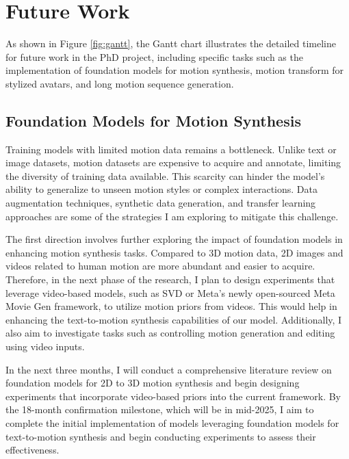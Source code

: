 \documentclass[a4paper, 12pt]{article}
\begin{document}
\section{Future Work}

As shown in Figure \ref{fig:gantt}, the Gantt chart illustrates the detailed timeline for future work in the PhD project, including specific tasks such as the implementation of foundation models for motion synthesis, motion transform for stylized avatars, and long motion sequence generation.

\subsection{Foundation Models for Motion Synthesis}
Training models with limited motion data remains a bottleneck. Unlike text or image datasets, motion datasets are expensive to acquire and annotate, limiting the diversity of training data available. This scarcity can hinder the model’s ability to generalize to unseen motion styles or complex interactions. Data augmentation techniques, synthetic data generation, and transfer learning approaches are some of the strategies I am exploring to mitigate this challenge.

The first direction involves further exploring the impact of foundation models in enhancing motion synthesis tasks. Compared to 3D motion data, 2D images and videos related to human motion are more abundant and easier to acquire. Therefore, in the next phase of the research, I plan to design experiments that leverage video-based models, such as SVD \cite{blattmann2023stable} or Meta's newly open-sourced Meta Movie Gen \cite{meta_movie_generation} framework, to utilize motion priors from videos. This would help in enhancing the text-to-motion synthesis capabilities of our model. Additionally, I also aim to investigate tasks such as controlling motion generation and editing using video inputs.

In the next three months, I will conduct a comprehensive literature review on foundation models for 2D to 3D motion synthesis and begin designing experiments that incorporate video-based priors into the current framework. By the 18-month confirmation milestone, which will be in mid-2025, I aim to complete the initial implementation of models leveraging foundation models for text-to-motion synthesis and begin conducting experiments to assess their effectiveness.
\end{document}
